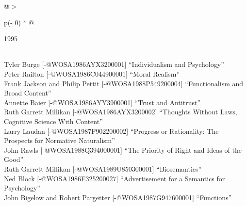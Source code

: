 \documentclass[
  10pt,
  letterpaper,
  DIV=11,
  numbers=noendperiod,
  twoside]{scrartcl}
\begin{document}
\begin{longtable}[]{@{}
  >{\raggedright\arraybackslash}p{(\columnwidth - 0\tabcolsep) * }@{}}

\caption{\label{tbl-top-ten-1986}Most cited articles published less than
ten years ago as of 1995.}

\tabularnewline

\toprule\noalign{}
\begin{minipage}[b]{\linewidth}\raggedright
1995
\end{minipage} \\
\midrule\noalign{}
\endhead
\bottomrule\noalign{}
\endlastfoot
Tyler Burge {[}-@WOSA1986AYX3200001{]} ``Individualism and
Psychology'' \\
Peter Railton {[}-@WOSA1986C044900001{]} ``Moral Realism'' \\
Frank Jackson and Philip Pettit {[}-@WOSA1988P549200004{]}
``Functionalism and Broad Content'' \\
Annette Baier {[}-@WOSA1986AYY3900001{]} ``Trust and Antitrust'' \\
Ruth Garrett Millikan {[}-@WOSA1986AYX3200002{]} ``Thoughts Without
Laws, Cognitive Science With Content'' \\
Larry Laudan {[}-@WOSA1987F902200002{]} ``Progress or Rationality: The
Prospects for Normative Naturalism'' \\
John Rawls {[}-@WOSA1988Q394000001{]} ``The Priority of Right and Ideas
of the Good'' \\
Ruth Garrett Millikan {[}-@WOSA1989U850300001{]} ``Biosemantics'' \\
Ned Block {[}-@WOSA1986E325200027{]} ``Advertisement for a Semantics for
Psychology'' \\
John Bigelow and Robert Pargetter {[}-@WOSA1987G947600001{]}
``Functions'' \\

\end{longtable}
\end{document}
